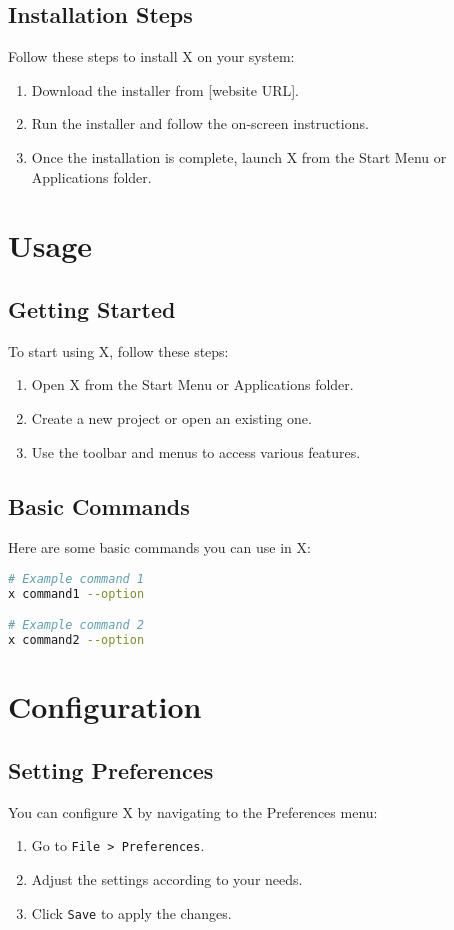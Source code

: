 \documentclass[a4paper,12pt]{article}
\begin{document}
\subsection{Installation Steps}
Follow these steps to install X on your system:
\begin{enumerate}
    \item Download the installer from [website URL].
    \item Run the installer and follow the on-screen instructions.
    \item Once the installation is complete, launch X from the Start Menu or Applications folder.
\end{enumerate}

\section{Usage}
\subsection{Getting Started}
To start using X, follow these steps:
\begin{enumerate}
    \item Open X from the Start Menu or Applications folder.
    \item Create a new project or open an existing one.
    \item Use the toolbar and menus to access various features.
\end{enumerate}

\subsection{Basic Commands}
Here are some basic commands you can use in X:
\begin{lstlisting}[language=bash]
# Example command 1
x command1 --option

# Example command 2
x command2 --option
\end{lstlisting}

\section{Configuration}
\subsection{Setting Preferences}
You can configure X by navigating to the Preferences menu:
\begin{enumerate}
    \item Go to \texttt{File > Preferences}.
    \item Adjust the settings according to your needs.
    \item Click \texttt{Save} to apply the changes.
\end{enumerate}
\end{document}
